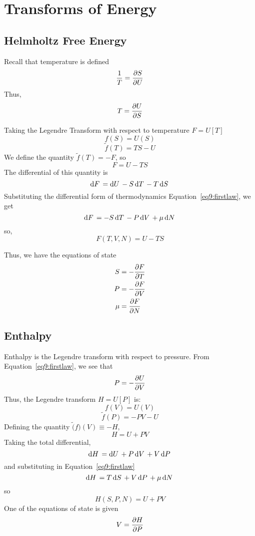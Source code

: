 \section{Transforms of Energy}
\subsection{Helmholtz Free Energy}
Recall that temperature is defined
\[\frac{1}{T}=\frac{\partial S}{\partial U}\]
Thus,
\begin{equation}
	T=\frac{\partial U}{\partial S}
\end{equation}

Taking the Legendre Transform with respect to temperature \(F=U[T]\)
\[f(S)=U(S)\]
\[\tilde{f}(T)=TS-U\]
We define the quantity \(\tilde{f}(T)=-F\), so
\[F=U-TS\]
The differential of this quantity is
\[\d{F}=\d{U}-S\d{T}-T\d{S}\]
Substituting the differential form of thermodynamics Equation~\ref{eq9:firstlaw}, we get
\begin{equation}
	\d{F}=-S\d{T}-P\d{V}+\mu\d{N} \label{eq11:diffhelmholz}
\end{equation}
so,
\begin{equation}
	F(T,V,N)=U-TS \label{eq11:helmholtz}
\end{equation}

Thus, we have the equations of state
\begin{subequations}
	\begin{align}
		S&=-\frac{\partial F}{\partial T}\\
		P&=-\frac{\partial F}{\partial V}\\
		\mu&=\frac{\partial F}{\partial N}
	\end{align}
\end{subequations}

\subsection{Enthalpy}
Enthalpy is the Legendre transform with respect to pressure. From Equation~\ref{eq9:firstlaw}, we see that 
\[P=-\frac{\partial U}{\partial V}\]
Thus, the Legendre transform \(H=U[P]\) is:
\[f(V)=U(V)\]
\[\tilde{f}(P)=-PV-U\]
Defining the quantity \(\tilde(f)(V)\equiv -H\),
\[H=U+PV\]
Taking the total differential,
\[\d{H}=\d{U}+P\d{V}+V\d{P}\]
and substituting in Equation~\ref{eq9:firstlaw}
\begin{equation}
	\d{H}=T\d{S}+V\d{P}+\mu\d{N} \label{eq11:diffenthalpy}
\end{equation}
so
\begin{equation}
	H(S,P,N)=U+PV \label{eq11:enthalpy}
\end{equation}
One of the equations of state is given
\begin{equation}
	V=\frac{\partial H}{\partial P}
\end{equation}

